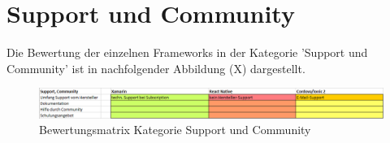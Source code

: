 \section{Support und Community}

Die Bewertung der einzelnen Frameworks in der Kategorie 'Support und Community' ist in nachfolgender Abbildung (X) dargestellt.

\begin{figure}[h]
	\centering
	\includegraphics[width=1\textwidth]{Bilder/Auswertung_SupportCommunity.PNG}
	\caption{Bewertungsmatrix Kategorie Support und Community}
	\label{fig:AuswEntw}
\end{figure}

